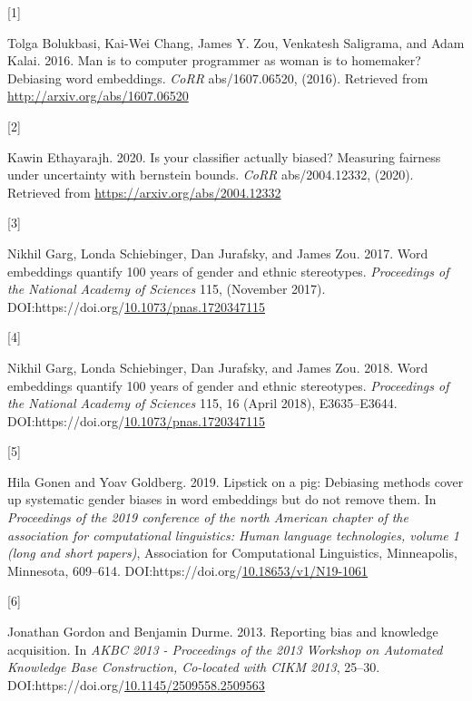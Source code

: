 \documentclass[
  10pt,
  dvipsnames,enabledeprecatedfontcommands]{scrartcl}
\newlength{\cslhangindent}
\newlength{\csllabelwidth}
\newlength{\cslentryspacingunit} %
\newenvironment{CSLReferences}[2] %
 {%
  \setlength{\parindent}{0pt}
  \ifodd #1
  \let\oldpar\par
  \def\par{\hangindent=\cslhangindent\oldpar}
  \fi
  \setlength{\parskip}{#2\cslentryspacingunit}
 }%
 {}
\newcommand{\CSLLeftMargin}[1]{\parbox[t]{\csllabelwidth}{#1}}
\newcommand{\CSLRightInline}[1]{\parbox[t]{\linewidth - \csllabelwidth}{#1}\break}
\begin{document}
\hypertarget{refs}{}
\begin{CSLReferences}{0}{0}
\leavevmode{}%
\CSLLeftMargin{{[}1{]} }%
\CSLRightInline{Tolga Bolukbasi, Kai-Wei Chang, James Y. Zou, Venkatesh
Saligrama, and Adam Kalai. 2016. Man is to computer programmer as woman
is to homemaker? Debiasing word embeddings. \emph{CoRR} abs/1607.06520,
(2016). Retrieved from \url{http://arxiv.org/abs/1607.06520}}

\leavevmode{}%
\CSLLeftMargin{{[}2{]} }%
\CSLRightInline{Kawin Ethayarajh. 2020. Is your classifier actually
biased? Measuring fairness under uncertainty with bernstein bounds.
\emph{CoRR} abs/2004.12332, (2020). Retrieved from
\url{https://arxiv.org/abs/2004.12332}}

\leavevmode{}%
\CSLLeftMargin{{[}3{]} }%
\CSLRightInline{Nikhil Garg, Londa Schiebinger, Dan Jurafsky, and James
Zou. 2017. Word embeddings quantify 100 years of gender and ethnic
stereotypes. \emph{Proceedings of the National Academy of Sciences} 115,
(November 2017).
DOI:https://doi.org/\href{https://doi.org/10.1073/pnas.1720347115}{10.1073/pnas.1720347115}}

\leavevmode{}%
\CSLLeftMargin{{[}4{]} }%
\CSLRightInline{Nikhil Garg, Londa Schiebinger, Dan Jurafsky, and James
Zou. 2018. Word embeddings quantify 100 years of gender and ethnic
stereotypes. \emph{Proceedings of the National Academy of Sciences} 115,
16 (April 2018), E3635--E3644.
DOI:https://doi.org/\href{https://doi.org/10.1073/pnas.1720347115}{10.1073/pnas.1720347115}}

\leavevmode{}%
\CSLLeftMargin{{[}5{]} }%
\CSLRightInline{Hila Gonen and Yoav Goldberg. 2019. Lipstick on a pig:
{D}ebiasing methods cover up systematic gender biases in word embeddings
but do not remove them. In \emph{Proceedings of the 2019 conference of
the north {A}merican chapter of the association for computational
linguistics: Human language technologies, volume 1 (long and short
papers)}, Association for Computational Linguistics, Minneapolis,
Minnesota, 609--614.
DOI:https://doi.org/\href{https://doi.org/10.18653/v1/N19-1061}{10.18653/v1/N19-1061}}

\leavevmode{}%
\CSLLeftMargin{{[}6{]} }%
\CSLRightInline{Jonathan Gordon and Benjamin Durme. 2013. Reporting bias
and knowledge acquisition. In \emph{AKBC 2013 - Proceedings of the 2013
Workshop on Automated Knowledge Base Construction, Co-located with CIKM
2013}, 25--30.
DOI:https://doi.org/\href{https://doi.org/10.1145/2509558.2509563}{10.1145/2509558.2509563}}


\end{CSLReferences}
\end{document}
